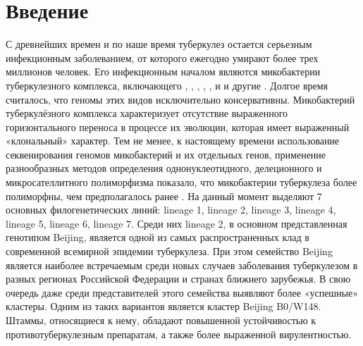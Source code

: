 \section{Введение}
С древнейших времен и по наше время туберкулез остается серьезным инфекционным заболеванием, от которого ежегодно умирают более трех миллионов человек. Его инфекционным началом являются микобактерии туберкулезного комплекса, включающего , , , , ,  и  и другие \cite{brosch2002new}. Долгое время считалось, что геномы этих видов исключительно консервативны. Микобактерий туберкулёзного комплекса характеризует отсутствие выраженного горизонтального переноса в процессе их эволюции, которая имеет выраженный «клональный» характер. Тем не менее, к настоящему времени использование секвенирования геномов микобактерий и их отдельных генов, применение разнообразных методов определения однонуклеотидного, делеционного и микросателлитного полиморфизма показало, что микобактерии туберкулеза более полиморфны, чем предполагалось ранее \cite{tsolaki2004functional}. На данный момент выделяют 7 основных филогенетических линий: lineage 1, lineage 2, lineage 3, lineage 4, lineage 5, lineage 6, lineage 7. Среди них lineage  2, в основном представленная генотипом Beijing, является одной из самых распространенных клад в современной всемирной эпидемии туберкулеза. При этом семейство Beijing является наиболее встречаемым среди новых случаев заболевания туберкулезом в разных регионах Российской Федерации и странах ближнего зарубежья. В свою очередь даже среди представителей этого семейства выявляют более «успешные» кластеры. Одним из таких вариантов является кластер Beijing B0/W148. Штаммы, относящиеся к нему, обладают повышенной устойчивостью к противотуберкулезным препаратам, а также более выраженной вирулентностью.
